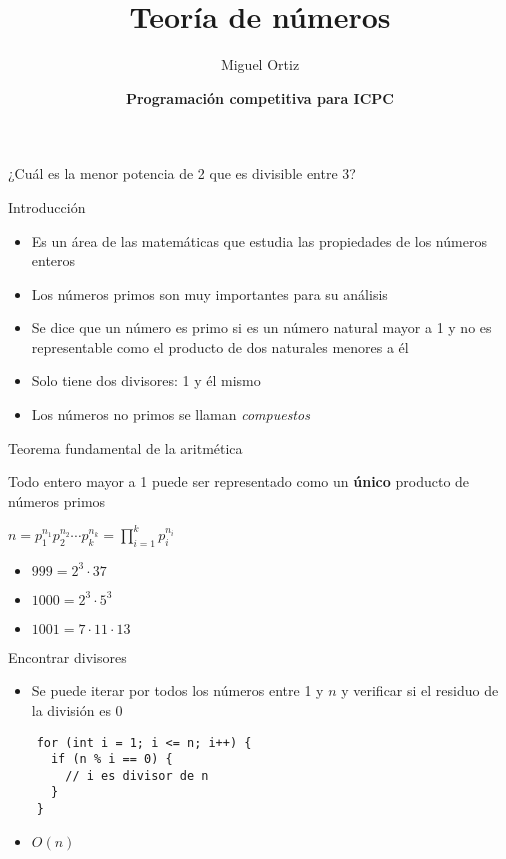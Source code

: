 \documentclass[10pt]{beamer}
\title{Teoría de números}
\author{Miguel Ortiz}
\institute{Mayo 2023 - Cochabamba, Bolivia}
\date{\textbf{Programación competitiva para ICPC}}
\newcommand{\bi}{\begin{itemize}}
\newcommand{\ei}{\end{itemize}}
\begin{document}
\maketitle

\begin{frame}
  \begin{center}
    ¿Cuál es la menor potencia de 2 que es divisible entre 3?
  \end{center}
\end{frame}

\begin{frame}{Introducción}
  \bi
    \item Es un área de las matemáticas que estudia las propiedades de los números enteros
    \item Los números primos son muy importantes para su análisis
    
    \vspace{20pt}

    \item<2-> Se dice que un número es primo si es un número natural mayor a 1 y no es representable como el producto de dos naturales menores a él
    \item<2-> Solo tiene dos divisores: 1 y él mismo
    \item<3-> Los números no primos se llaman \textit{compuestos}
  \ei
\end{frame}

\begin{frame}{Teorema fundamental de la aritmética}
  \begin{center}
    Todo entero mayor a 1 puede ser representado como un \textbf{único} producto de números primos
    
    \vspace{10pt}

    $n = p_1^{n_1} p_2^{n_2} \cdots p_k^{n_k} = \prod_{i=1}^{k}p_i^{n_i}$
  \end{center}

  \vspace{20pt}

  \bi
    \item $999 = 2^3 \cdot 37$
    \item $1000 = 2^3 \cdot 5^3$
    \item $1001 = 7 \cdot 11 \cdot 13$
  \ei
\end{frame}

\begin{frame}[fragile]{Encontrar divisores}
  \bi
    \item Se puede iterar por todos los números entre 1 y $n$ y verificar si el residuo de la división es 0
  \ei
  \begin{verbatim}
    for (int i = 1; i <= n; i++) {
      if (n % i == 0) {
        // i es divisor de n
      }
    }
  \end{verbatim}
  \bi
    \item $O(n)$
  \ei
\end{frame}
\end{document}
